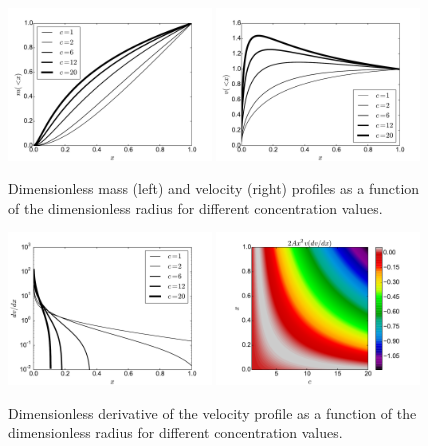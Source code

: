 \documentclass{emulateapj}
\begin{document}
\begin{figure}
\begin{center}
  \includegraphics[width=0.48\textwidth]{nfw_normalized.pdf}
  \includegraphics[width=0.48\textwidth]{vel_normalized.pdf}
\end{center}
\caption{Dimensionless mass (left) and velocity (right) profiles as a
  function of the dimensionless radius for different concentration
  values. \label{fig:profiles}}
\end{figure}

\begin{figure}
\begin{center}
  \includegraphics[width=0.48\textwidth]{dv_dx.pdf}
  \includegraphics[width=0.48\textwidth]{zeros.pdf}
\end{center}
\caption{Dimensionless derivative of the velocity profile as a
  function of the dimensionless radius for different concentration
  values. \label{fig:profiles}}
\end{figure}
\end{document}
